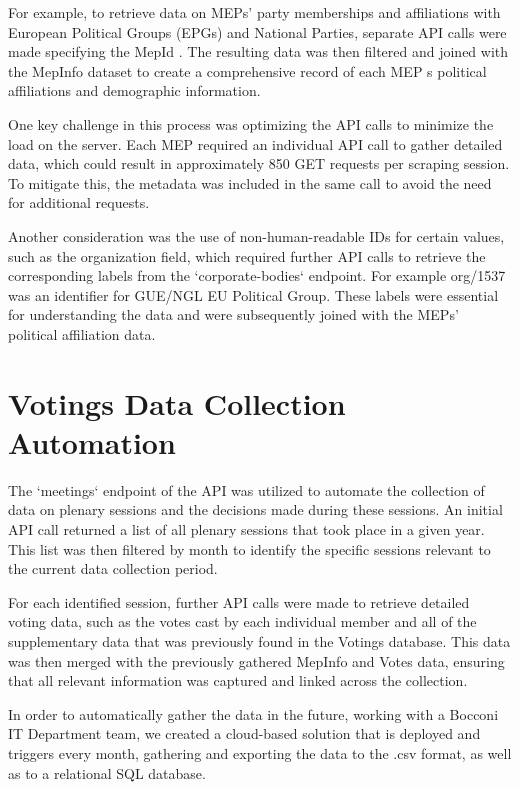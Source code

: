 \documentclass[a4paper,12pt]{report}
\begin{document}
    For example, to retrieve data on MEPs' party memberships and affiliations with European Political Groups
    (EPGs) and
    National Parties, separate API calls were made specifying the MepId . The resulting data was then filtered
    and joined
    with the MepInfo dataset to create a comprehensive record of each MEP s political affiliations and
    demographic
    information.

    One key challenge in this process was optimizing the API calls to minimize the load on the server. Each MEP
    required
    an individual API call to gather detailed data, which could result in approximately 850 GET requests per
    scraping
    session. To mitigate this, the metadata was included in the same call to avoid the need for additional
    requests.

    Another consideration was the use of non-human-readable IDs for certain values, such as the organization
    field,
    which required further API calls to retrieve the corresponding labels from the `corporate-bodies` endpoint.
    For
    example org/1537 was an identifier for GUE/NGL EU Political Group. These labels were essential for
    understanding the
    data and were subsequently joined with the MEPs' political affiliation data.


    \section{Votings Data Collection Automation}\label{sec:votings-data-collection-automation}

    The `meetings` endpoint of the API was utilized to automate the collection of data on plenary sessions and
    the
    decisions made during these sessions. An initial API call returned a list of all plenary sessions that took
    place in
    a given year. This list was then filtered by month to identify the specific sessions relevant to the current
    data
    collection period.

    For each identified session, further API calls were made to retrieve detailed voting data, such as the votes
    cast by
    each individual member and all of the supplementary data that was previously found in the Votings database.
    This
    data was then merged with the previously gathered MepInfo and Votes data, ensuring that all relevant
    information was
    captured and linked across the collection.

    In order to automatically gather the data in the future, working with a Bocconi IT Department team, we
    created a
    cloud-based solution that is deployed and triggers every month, gathering and exporting the data to the .csv
    format,
    as well as to a relational SQL database.
\end{document}
